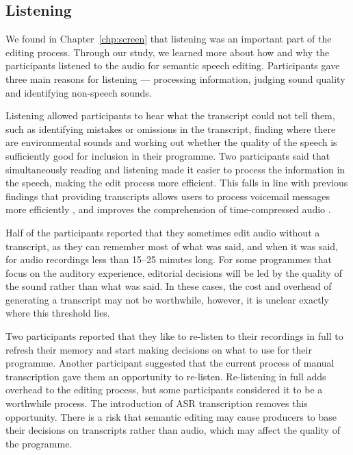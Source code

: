 \subsection{Listening}

We found in Chapter~\ref{chp:screen} that listening was an important part of the editing process. Through our study, we
learned more about how and why the participants listened to the audio for semantic speech editing.  Participants gave
three main reasons for listening --- processing information, judging sound quality and identifying non-speech sounds.

Listening allowed participants to hear what the transcript could not tell them, such as identifying mistakes or
omissions in the transcript, finding where there are environmental sounds and working out whether the quality of the
speech is sufficiently good for inclusion in their programme.  Two participants said that simultaneously reading and
listening made it easier to process the information in the speech, making the edit process more efficient. This falls
in line with previous findings that providing transcripts allows users to process voicemail messages more efficiently
\citep{Whittaker2002}, and improves the comprehension of time-compressed audio \citep{Vemuri2004}.

Half of the participants reported that they sometimes edit audio without a transcript, as they can remember most of
what was said, and when it was said, for audio recordings less than 15--25 minutes long.  For some programmes that
focus on the auditory experience, editorial decisions will be led by the quality of the sound rather than what was
said. In these cases, the cost and overhead of generating a transcript may not be worthwhile, however, it is unclear
exactly where this threshold lies.

Two participants reported that they like to re-listen to their recordings in full to refresh their memory and start
making decisions on what to use for their programme.  Another participant suggested that the current process of manual
transcription gave them an opportunity to re-listen.  Re-listening in full adds overhead to the editing process, but
some participants considered it to be a worthwhile process.  The introduction of ASR transcription removes this
opportunity. There is a risk that semantic editing may cause producers to base their decisions on transcripts rather
than audio, which may affect the quality of the programme.

